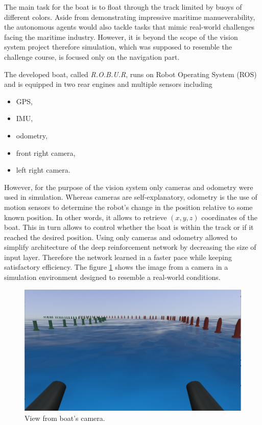 The main task for the boat is to float through the track limited by buoys of different colors. Aside from demonstrating
impressive maritime manueverability, the autonomous agents would also tackle tasks that mimic real-world challenges facing
the maritime industry. However, it is beyond the scope of the vision system project therefore simulation, which was supposed to
resemble the challenge course, is focused only on the navigation part.

The developed boat, called \emph{R.O.B.U.R}, runs on Robot Operating System (ROS) and is equipped in two rear engines and multiple sensors including

\begin{itemize}
    \item GPS,
    \item IMU,
    \item odometry,
    \item front right camera,
    \item left right camera.
\end{itemize}

However, for the purpose of the vision system only cameras and odometry were used in simulation. Whereas cameras are self-explanatory, odometry is the use of motion sensors to determine the robot's change in the position relative to some known position. In other words, it allows to retrieve $(x, y, z)$ coordinates of the boat. This in turn allows to control whether the boat is within the track or if it reached the desired position. Using only cameras and odometry allowed to simplify
architecture of the deep reinforcement network by decreasing the size of input layer. Therefore the network learned in a faster
pace while keeping satisfactory efficiency. The figure \ref{fig:camera-view} shows the image from a camera in a
simulation environment designed to resemble a real-world conditions.

\begin{figure}[h]
    \centering
    \includegraphics[width=16cm]{img/front_camera_image.png}
    \caption{View from boat's camera.}
    \label{fig:camera-view}
\end{figure}

